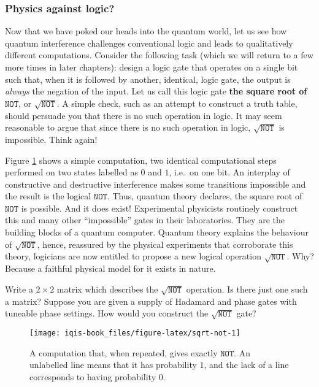 \documentclass[fleqn]{article}
\begin{document}
\hypertarget{physics-against-logic}{%
\subsubsection{Physics against logic?}\label{physics-against-logic}}

Now that we have poked our heads into the quantum world, let us see how quantum interference challenges conventional logic and leads to qualitatively different computations.
Consider the following task (which we will return to a few more times in later chapters): design a logic gate that operates on a single bit such that, when it is followed by another, identical, logic gate, the output is \emph{always} the negation of the input.
Let us call this logic gate \textbf{the square root of \(\texttt{NOT}\)}, or \(\sqrt{\texttt{NOT}}\).
A simple check, such as an attempt to construct a truth table, should persuade you that there is no such operation in logic.
It may seem reasonable to argue that since there is no such operation in logic, \(\sqrt{\texttt{NOT}}\) is impossible.
Think again!

Figure \ref{fig:sqrt-not} shows a simple computation, two identical computational steps performed on two states labelled as \(0\) and \(1\), i.e.~on one bit.
An interplay of constructive and destructive interference makes some transitions impossible and the result is the logical \(\texttt{NOT}\).
Thus, quantum theory declares, the square root of \(\texttt{NOT}\) is possible.
And it does exist!
Experimental physicists routinely construct this and many other ``impossible'' gates in their laboratories.
They are the building blocks of a quantum computer.
Quantum theory explains the behaviour of \(\sqrt{\texttt{NOT}}\), hence, reassured by the physical experiments that corroborate this theory, logicians are now entitled to propose a new logical operation \(\sqrt{\texttt{NOT}}\).
Why?
Because a faithful physical model for it exists in nature.

Write a \(2\times 2\) matrix which describes the \(\sqrt{\texttt{NOT}}\) operation.
Is there just one such a matrix?
Suppose you are given a supply of Hadamard and phase gates with tuneable phase settings.
How would you construct the \(\sqrt{\texttt{NOT}}\) gate?



\begin{figure}[H]

{\centering \texttt{[image: iqis-book\_files/figure-latex/sqrt-not-1]} 

}

\caption{A computation that, when repeated, gives exactly \(\texttt{NOT}\). An unlabelled line means that it has probability \(1\), and the lack of a line corresponds to having probability \(0\).}\label{fig:sqrt-not}
\end{figure}
\end{document}

